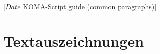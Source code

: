 %
%
%
%
%
%
%
%
% 
%
%
%
%

                 [$Date$
                  KOMA-Script guide (common paragraphs)]

\section{Textauszeichnungen}
%
\BeginIndexGroup
{}%
%

